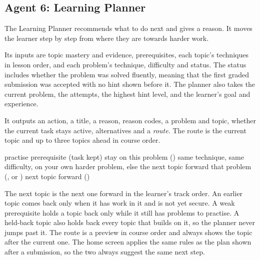 \subsection{Agent 6: Learning Planner}
The Learning Planner recommends what to do next and gives a reason. It moves the learner step by step from where they are towards harder work.

Its inputs are topic mastery and evidence, prerequisites, each topic's techniques in lesson order, and each problem's technique, difficulty and status. The status includes whether the problem was solved fluently, meaning that the first graded submission was accepted with no hint shown before it. The planner also takes the current problem, the attempts, the highest hint level, and the learner's goal and experience.

It outputs an action, a title, a reason, reason codes, a problem and topic, whether the current task stays active, alternatives and a \emph{route}. The route is the current topic and up to three topics ahead in course order.

\begin{algorithm}[htbp]
\caption{Next-step selection after an attempt}\label{alg:plan}
\small
\begin{algorithmic}[1]
   \Return practise prerequisite (task kept)
  \EndIf
  \State \Return stay on this problem ()
\EndIf
{} \Return same technique, same difficulty, on your own
\EndIf
{} \Return harder problem, else the next topic forward
\EndIf
{}
      \State \Return that problem (,  or )
    \EndIf
  \EndFor
\EndFor
\State \Return next topic forward ()
\end{algorithmic}
\end{algorithm}

The next topic is the next one forward in the learner's track order. An earlier topic comes back only when it has work in it and is not yet secure. A weak prerequisite holds a topic back only while it still has problems to practise. A held-back topic also holds back every topic that builds on it, so the planner never jumps past it. The route is a preview in course order and always shows the topic after the current one. The home screen applies the same rules as the plan shown after a submission, so the two always suggest the same next step.

